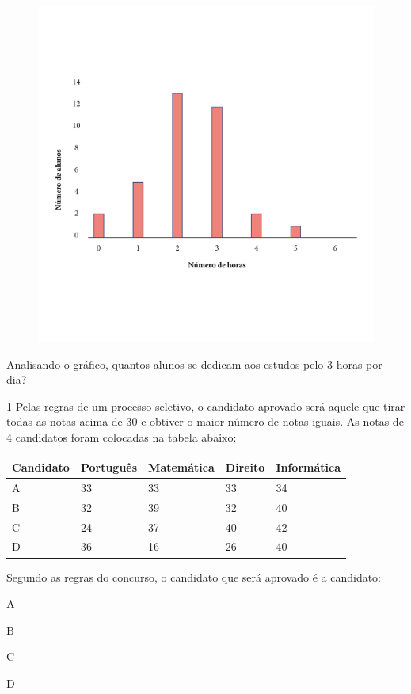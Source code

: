 \begin{figure}[htpb!]
\includegraphics[width=\textwidth]{../ilustracoes/MAT5/SAEB_5ANO_MAT_figura109.png}
\end{figure}

Analisando o gráfico, quantos alunos se dedicam aos estudos pelo 3 horas
por dia?




\num{1} Pelas regras de um processo seletivo, o candidato aprovado
será aquele que tirar todas as notas acima de 30 e obtiver o
maior número de notas iguais. As notas de 4 candidatos foram colocadas
na tabela abaixo:

\begin{longtable}[]{@{}lllll@{}}
\toprule
Candidato & Português & Matemática & Direito &
Informática\tabularnewline
\midrule
\endhead
A & 33 & 33 & 33 & 34\tabularnewline
B & 32 & 39 & 32 & 40\tabularnewline
C & 24 & 37 & 40 & 42\tabularnewline
D & 36 & 16 & 26 & 40\tabularnewline
\bottomrule
\end{longtable}

Segundo as regras do concurso, o candidato que será aprovado é a
candidato:

\begin{escolha}
\item
  A
\item
  B
\item
  C
\item
  D
\end{escolha}

